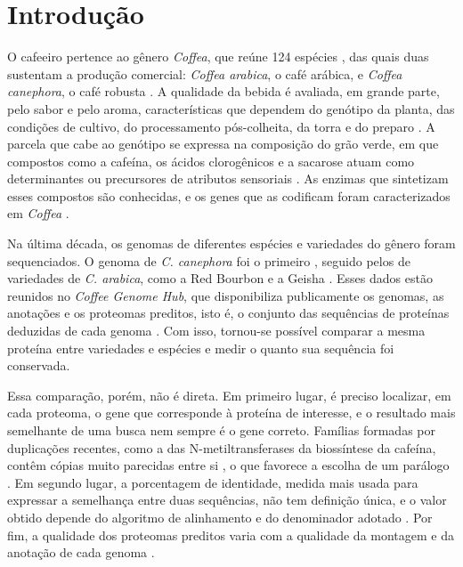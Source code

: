 \chapter{Introdução}
\label{cap:01}

O cafeeiro pertence ao gênero \textit{Coffea}, que reúne 124 espécies \cite{Davis2011}, das quais duas sustentam a produção comercial: \textit{Coffea arabica}, o café arábica, e \textit{Coffea canephora}, o café robusta \cite{Privat2008}. A qualidade da bebida é avaliada, em grande parte, pelo sabor e pelo aroma, características que dependem do genótipo da planta, das condições de cultivo, do processamento pós-colheita, da torra e do preparo \cite{Buffo2004, Ludwig2014}. A parcela que cabe ao genótipo se expressa na composição do grão verde, em que compostos como a cafeína, os ácidos clorogênicos e a sacarose atuam como determinantes ou precursores de atributos sensoriais \cite{Ludwig2014}. As enzimas que sintetizam esses compostos são conhecidas, e os genes que as codificam foram caracterizados em \textit{Coffea} \cite{Uefuji2003, Lallemand2012, Privat2008}.

Na última década, os genomas de diferentes espécies e variedades do gênero foram sequenciados. O genoma de \textit{C. canephora} foi o primeiro \cite{Denoeud2014}, seguido pelos de variedades de \textit{C. arabica}, como a Red Bourbon \cite{Scalabrin2020, Scalabrin2024} e a Geisha \cite{Medrano2025}. Esses dados estão reunidos no \textit{Coffee Genome Hub}, que disponibiliza publicamente os genomas, as anotações e os proteomas preditos, isto é, o conjunto das sequências de proteínas deduzidas de cada genoma \cite{Dereeper2015, CoffeeHub}. Com isso, tornou-se possível comparar a mesma proteína entre variedades e espécies e medir o quanto sua sequência foi conservada.

Essa comparação, porém, não é direta. Em primeiro lugar, é preciso localizar, em cada proteoma, o gene que corresponde à proteína de interesse, e o resultado mais semelhante de uma busca nem sempre é o gene correto. Famílias formadas por duplicações recentes, como a das N-metiltransferases da biossíntese da cafeína, contêm cópias muito parecidas entre si \cite{Denoeud2014}, o que favorece a escolha de um parálogo \cite{MorenoHagelsieb2008}. Em segundo lugar, a porcentagem de identidade, medida mais usada para expressar a semelhança entre duas sequências, não tem definição única, e o valor obtido depende do algoritmo de alinhamento e do denominador adotado \cite{May2004, Raghava2006}. Por fim, a qualidade dos proteomas preditos varia com a qualidade da montagem e da anotação de cada genoma \cite{Alkan2011, Yandell2012}.

